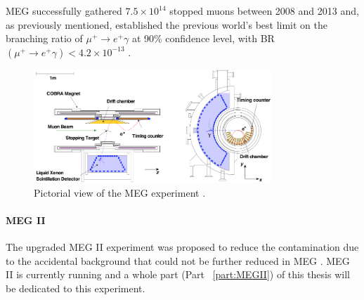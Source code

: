 \begin{refsection}
        \noindent
        MEG successfully gathered $7.5\times10^{14}$ stopped muons between 2008 and 2013 and, as previously mentioned, established the previous world's best limit on the branching ratio of $\mu^+\rightarrow e^+\gamma$ at 90\% confidence level, with BR$(\mu^+\rightarrow e^+\gamma)<4.2\times10^{-13}$ \cite{MEG}.

        \begin{figure}
            \centering
            \includegraphics[width=0.8\textwidth]{Figures/Introduction/MEG.png}
            \caption[cLFV: MEG experiment]{Pictorial view of the MEG experiment \cite{Chiappini}\cite{MEG}.}
            \label{_MEG}
        \end{figure}

        \paragraph{MEG II} 
        The upgraded MEG II experiment was proposed to reduce the contamination due to the accidental background that could not be further reduced in MEG \cite{MEG_upgrade} \cite{MEG_II}.
        MEG II is currently running and a whole part (Part ~\ref{part:MEGII}) of this thesis will be dedicated to this experiment.        
        

\end{refsection}
